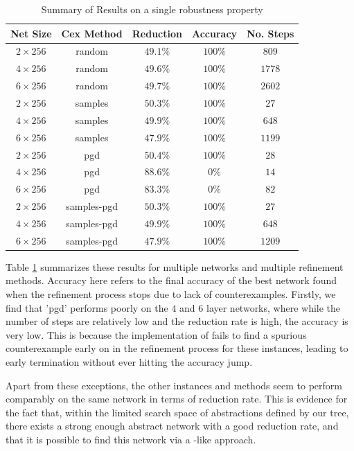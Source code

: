 \begin{table}
\begin{tabular}{|c|c|c|c|c|}
    \hline
    Net Size     & Cex Method  & Reduction & Accuracy & No. Steps \\
    \hline
    $2\times256$ & random      & $49.1\%$  & $100\%$  & $ 809$    \\
    $4\times256$ & random      & $49.6\%$  & $100\%$  & $1778$    \\
    $6\times256$ & random      & $49.7\%$  & $100\%$  & $2602$    \\
    $2\times256$ & samples     & $50.3\%$  & $100\%$  & $  27$    \\
    $4\times256$ & samples     & $49.9\%$  & $100\%$  & $ 648$    \\
    $6\times256$ & samples     & $47.9\%$  & $100\%$  & $1199$    \\
    $2\times256$ & pgd         & $50.4\%$  & $100\%$  & $  28$    \\
    $4\times256$ & pgd         & $88.6\%$  & $  0\%$  & $  14$    \\
    $6\times256$ & pgd         & $83.3\%$  & $  0\%$  & $  82$    \\
    $2\times256$ & samples-pgd & $50.3\%$  & $100\%$  & $  27$    \\
    $4\times256$ & samples-pgd & $49.9\%$  & $100\%$  & $ 648$    \\
    $6\times256$ & samples-pgd & $47.9\%$  & $100\%$  & $1209$    \\
    \hline
\end{tabular}
\caption{Summary of \mnist Results on a single robustness property  }
\label{t:mnist-prop-summary}
\end{table}

Table \ref{t:mnist-prop-summary} summarizes these results for multiple \mnist
networks and multiple refinement methods. Accuracy here refers to the final
accuracy of the best network found when the refinement process stops due to lack
of counterexamples. Firstly, we find that 'pgd' performs poorly on the $4$ and
$6$ layer networks, where while the number of steps are relatively low and the
reduction rate is high, the accuracy is very low. This is because the \abcrown
implementation of \pgd fails to find a spurious counterexample early on in the
refinement process for these instances, leading to early termination without
ever hitting the accuracy jump. 

Apart from these exceptions, the other instances and methods seem to perform
comparably on the same network in terms of reduction rate. This is evidence for
the fact that, within the limited search space of abstractions defined by our
tree, there exists a strong enough abstract network with a good reduction rate,
and that it is possible to find this network via a \cegar-like approach. 

